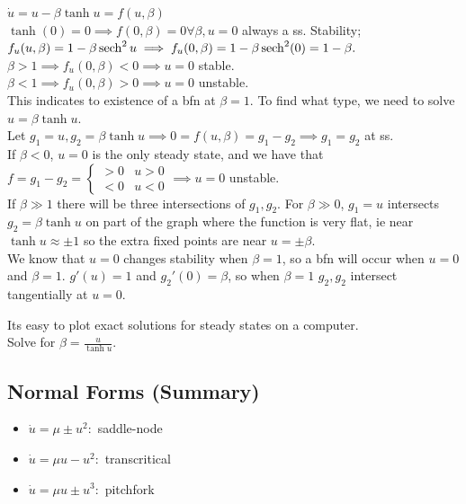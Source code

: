 \documentclass[12pt, oneside]{article}
\begin{document}
\begin{example}[3.4.1]
  $\dot{u} = u - \beta \tanh u = f(u, \beta)$\footnotemark\\
  $\tanh(0) = 0 \implies f(0, \beta) = 0 \forall \beta, u=0$ always a ss. Stability; $f_u(u,\beta) = 1 - \beta \sech^2u \implies f_u(0,\beta) = 1 -\beta \sech^2(0) = 1 - \beta.$\\$\beta > 1 \implies f_u(0, \beta)<0 \implies u = 0$ stable.\\
  $\beta< 1\implies f_u(0, \beta) > 0 \implies u = 0$ unstable.\\
  This indicates to existence of a bfn at $\beta = 1$. To find what type, we need to solve $u = \beta \tanh u$.\\
  Let $g_1 = u, g_2 = \beta \tanh u \implies 0 = f(u, \beta) = g_1 - g_2 \implies g_1 = g_2$ at ss.\\
  If $\beta < 0$, $u = 0$ is the only steady state, and we have that $f=g_1-g_2 = \begin{cases}
    >0 & u>0\\
    <0 &u < 0
  \end{cases} \implies u = 0$ unstable.\\
  If $\beta\gg 1$ there will be three intersections of $g_1, g_2$. For $\beta \gg 0$, $g_1 = u$ intersects $g_2 = \beta \tanh u$ on part of the graph where the function is very flat, ie near $\tanh u \approx \pm 1$ so the extra fixed points are near $u =\pm \beta$.\\
  We know that $u = 0$ changes stability when $\beta = 1$, so a bfn will occur when $u = 0 $ and $\beta = 1$. $g'(u) = 1$ and $g_2'(0) = \beta$, so when $\beta = 1$ $g_2,g_2$ intersect tangentially at $u = 0$.
\end{example}


\begin{remark}
  Its easy to plot exact solutions for steady states on a computer.\\
  Solve for $\beta = \frac{u}{\tanh u}$.
\end{remark}

\subsection{Normal Forms (Summary)}

\begin{itemize}
  \item $\dot{u} = \mu \pm u^2:$ saddle-node
  \item $\dot{u} = \mu u - u^2:$ transcritical
  \item $\dot{u} = \mu u \pm u^3:$ pitchfork
\end{itemize}
\end{document}
